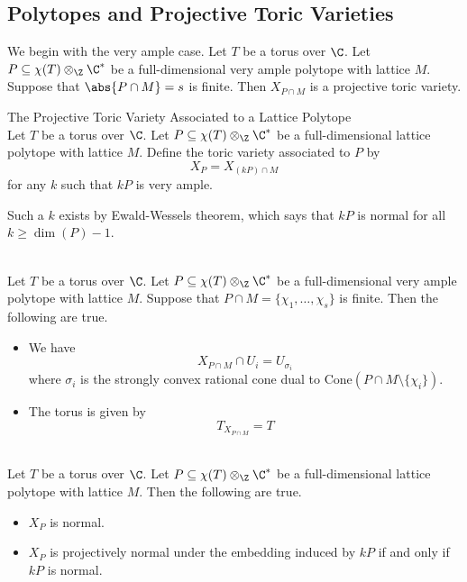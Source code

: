 \documentclass[a4paper]{article}
\begin{document}
\subsection{Polytopes and Projective Toric Varieties}
We begin with the very ample case. Let $T$ be a torus over $\C$. Let $P\subseteq\chi(T)\otimes_\Z\C^\ast$ be a full-dimensional very ample polytope with lattice $M$. Suppose that $\abs{P\cap M}=s$ is finite. Then $X_{P\cap M}$ is a projective toric variety. 

\begin{defn}{The Projective Toric Variety Associated to a Lattice Polytope}{}\\
Let $T$ be a torus over $\C$. Let $P\subseteq\chi(T)\otimes_\Z\C^\ast$ be a full-dimensional lattice polytope with lattice $M$. Define the toric variety associated to $P$ by $$X_P=X_{(kP)\cap M}$$ for any $k$ such that $kP$ is very ample. 
\end{defn}

Such a $k$ exists by Ewald-Wessels theorem, which says that $kP$ is normal for all $k\geq\dim(P)-1$. 

\begin{prp}{}{}\\
Let $T$ be a torus over $\C$. Let $P\subseteq\chi(T)\otimes_\Z\C^\ast$ be a full-dimensional very ample polytope with lattice $M$. Suppose that $P\cap M=\{\chi_1,\dots,\chi_s\}$ is finite. Then the following are true. 
\begin{itemize}
\item We have $$X_{P\cap M}\cap U_i=U_{\sigma_i}$$ where $\sigma_i$ is the strongly convex rational cone dual to $\text{Cone}(P\cap M\setminus\{\chi_i\})$. 
\item The torus is given by $$T_{X_{P\cap M}}=T$$
\end{itemize}
\end{prp}

\begin{prp}{}{}\\
Let $T$ be a torus over $\C$. Let $P\subseteq\chi(T)\otimes_\Z\C^\ast$ be a full-dimensional lattice polytope with lattice $M$. Then the following are true. 
\begin{itemize}
\item $X_P$ is normal. 
\item $X_P$ is projectively normal under the embedding induced by $kP$ if and only if $kP$ is normal. 
\end{itemize}
\end{prp}
\end{document}
